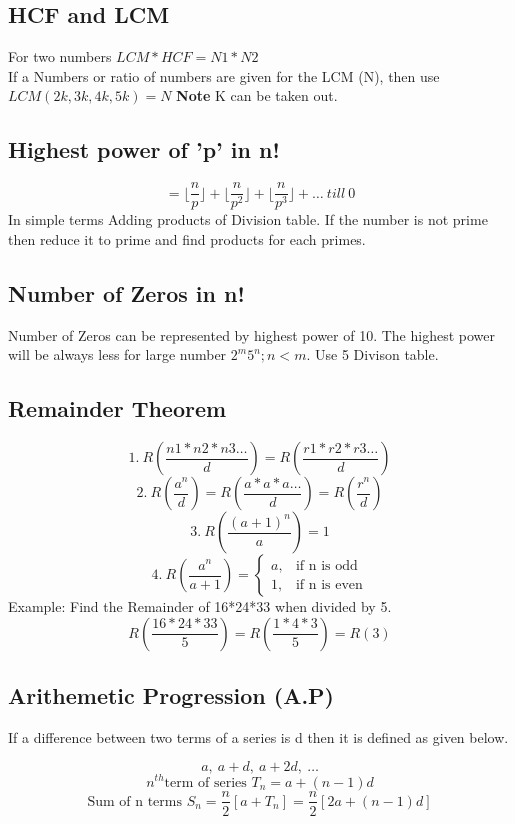 \subsection{HCF and LCM}
For two numbers \(LCM*HCF=N1*N2\)\\
If a Numbers or ratio of numbers are given for the LCM (N), then use
\(LCM(2k, 3k, 4k, 5k) = N\) \textbf{Note} K can be taken out.

\subsection{Highest power of 'p' in n!}
\[= \lfloor \frac{n}{p} \rfloor + \lfloor \frac{n}{p^2} \rfloor + \lfloor \frac{n}{p^3} \rfloor + \ldots \ till \ 0\]
In simple terms Adding products of Division table. If the number is not prime then reduce it to prime and find products for each primes.


\subsection{Number of Zeros in n!}
Number of Zeros can be represented by highest power of 10. The highest power will be always less for large number \(2^m 5^n; n<m\). Use 5 Divison table.


\subsection{Remainder Theorem}
\begin{fleqn}
    \[1.\ R\left( \frac{n1*n2*n3\ldots}{d}\right) = R\left(\frac{r1*r2*r3\ldots}{d}\right)\]
    \[2.\ R\left( \frac{a^n}{d}\right)=R\left(\frac{a*a*a\ldots}{d}\right) = R\left(\frac{r^n}{d}\right)\]
    \[3.\ R\left( \frac{(a+1)^n}{a}\right)=1\]
    \[4.\
    R\left( \frac{a^n}{a+1} \right) = 
    \begin{cases}
        a,& \text{if n is odd}\\
        1,& \text{if n is even}
    \end{cases}
    \]
Example: Find the Remainder of 16*24*33 when divided by 5.
\[R\left(\frac{16*24*33}{5}\right) = R\left(\frac{1*4*3}{5}\right) = R(3)\]
\end{fleqn}


\subsection{Arithemetic Progression (A.P)}
If a difference between two terms of a series is d then it is defined as given below.
\begin{fleqn}
\[a,\ a+d,\ a+2d,\ \ldots\]
\[n^{th} \text{term of series } T_n = a + (n-1)d\]
\[\text{Sum of n terms } S_n = \frac{n}{2}\left[ a+ T_n \right] = \frac{n}{2} \left[ 2a + (n-1)d \right]\]
\end{fleqn}


